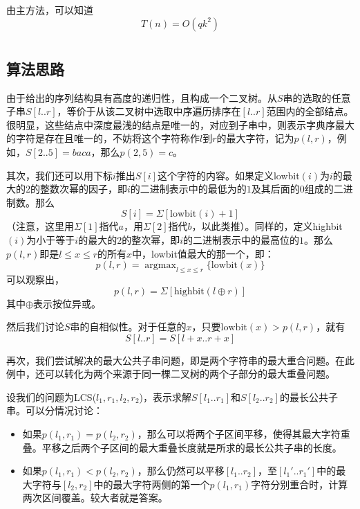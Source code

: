 \documentclass[UTF8]{ctexart}
\begin{document}
由主方法，可以知道
$$T(n) = O(qk^2)$$

\section{}
\subsection*{算法思路}
由于给出的序列结构具有高度的递归性，且构成一个二叉树。从$S$串的选取的任意子串$S[l..r]$，等价于从该二叉树中选取中序遍历排序在$[l..r]$范围内的全部结点。很明显，这些结点中深度最浅的结点是唯一的，对应到子串中，则表示字典序最大的字符是存在且唯一的，不妨将这个字符称作$l$到$r$的最大字符，记为$p(l, r)$，例如，$S[2..5]=baca$，那么$p(2, 5)=c$。

其次，我们还可以用下标$i$推出$S[i]$这个字符的内容。如果定义lowbit$(i)$为$i$的最大的$2$的整数次幂的因子，即$i$的二进制表示中的最低为的$1$及其后面的$0$组成的二进制数。那么
$$S[i]=\Sigma[\text{lowbit}(i)+1]$$
（注意，这里用$\Sigma[1]$指代$a$，用$\Sigma[2]$指代$b$，以此类推）。同样的，定义highbit$(i)$为小于等于$i$的最大的$2$的整次幂，即$i$的二进制表示中的最高位的$1$。那么$p(l, r)$即是$l\leq x\leq r$的所有$x$中，lowbit值最大的那一个，即：
$$p(l, r) = \mathop{\arg\max}_{l\leq x\leq r}{\{\text{lowbit}(x)\}}$$
可以观察出，
$$p(l, r) = \Sigma[\text{highbit}(l\oplus r)]$$
其中$\oplus$表示按位异或。

然后我们讨论$S$串的自相似性。对于任意的$x$，只要$\text{lowbit}(x) > p(l, r)$，就有
$$S[l..r] = S[l+x..r+x]$$

再次，我们尝试解决的最大公共子串问题，即是两个字符串的最大重合问题。在此例中，还可以转化为两个来源于同一棵二叉树的两个子部分的最大重叠问题。

设我们的问题为LCS($l_1, r_1, l_2, r_2$)，表示求解$S[l_1..r_1]$和$S[l_2..r_2]$的最长公共子串。可以分情况讨论：

\begin{itemize}
    \item 如果$p(l_1, r_1)=p(l_2, r_2)$，那么可以将两个子区间平移，使得其最大字符重叠。平移之后两个子区间的最大重叠长度就是所求的最长公共子串的长度。
    \item 如果$p(l_1, r_1) < p(l_2, r_2)$，那么仍然可以平移$[l_1..r_2]$，至$[l_1'..r_1']$中的最大字符与$[l_2, r_2]$中的最大字符两侧的第一个$p(l_1, r_1)$字符分别重合时，计算两次区间覆盖。较大者就是答案。
\end{itemize}
\end{document}
